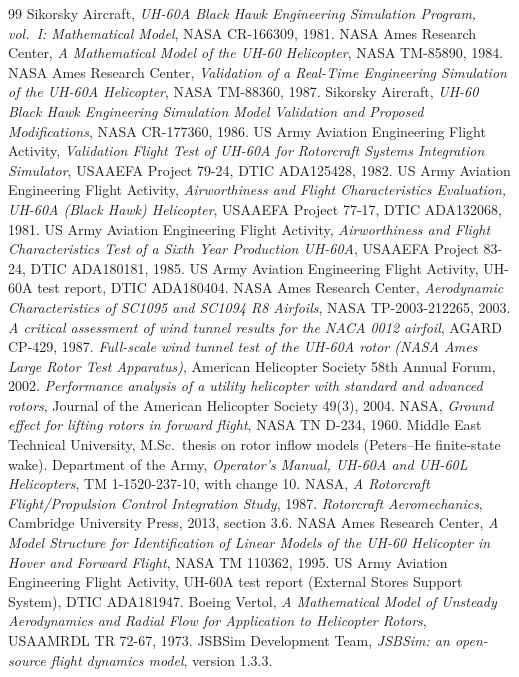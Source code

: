 \documentclass[10pt,a4paper,twocolumn]{article}
\begin{document}
\begin{thebibliography}{99}\small
{} Sikorsky Aircraft, \emph{UH-60A Black Hawk Engineering Simulation Program, vol.~I: Mathematical Model}, NASA CR-166309, 1981.
 NASA Ames Research Center, \emph{A Mathematical Model of the UH-60 Helicopter}, NASA TM-85890, 1984.
 NASA Ames Research Center, \emph{Validation of a Real-Time Engineering Simulation of the UH-60A Helicopter}, NASA TM-88360, 1987.
 Sikorsky Aircraft, \emph{UH-60 Black Hawk Engineering Simulation Model Validation and Proposed Modifications}, NASA CR-177360, 1986.
 US Army Aviation Engineering Flight Activity, \emph{Validation Flight Test of UH-60A for Rotorcraft Systems Integration Simulator}, USAAEFA Project 79-24, DTIC ADA125428, 1982.
 US Army Aviation Engineering Flight Activity, \emph{Airworthiness and Flight Characteristics Evaluation, UH-60A (Black Hawk) Helicopter}, USAAEFA Project 77-17, DTIC ADA132068, 1981.
 US Army Aviation Engineering Flight Activity, \emph{Airworthiness and Flight Characteristics Test of a Sixth Year Production UH-60A}, USAAEFA Project 83-24, DTIC ADA180181, 1985.
 US Army Aviation Engineering Flight Activity, UH-60A test report, DTIC ADA180404.
 NASA Ames Research Center, \emph{Aerodynamic Characteristics of SC1095 and SC1094 R8 Airfoils}, NASA TP-2003-212265, 2003.
 \emph{A critical assessment of wind tunnel results for the NACA 0012 airfoil}, AGARD CP-429, 1987.
 \emph{Full-scale wind tunnel test of the UH-60A rotor (NASA Ames Large Rotor Test Apparatus)}, American Helicopter Society 58th Annual Forum, 2002.
 \emph{Performance analysis of a utility helicopter with standard and advanced rotors}, Journal of the American Helicopter Society 49(3), 2004.
 NASA, \emph{Ground effect for lifting rotors in forward flight}, NASA TN D-234, 1960.
 Middle East Technical University, M.Sc.\ thesis on rotor inflow models (Peters--He finite-state wake).
 Department of the Army, \emph{Operator's Manual, UH-60A and UH-60L Helicopters}, TM 1-1520-237-10, with change 10.
 NASA, \emph{A Rotorcraft Flight/Propulsion Control Integration Study}, 1987.
 \emph{Rotorcraft Aeromechanics}, Cambridge University Press, 2013, section 3.6.
 NASA Ames Research Center, \emph{A Model Structure for Identification of Linear Models of the UH-60 Helicopter in Hover and Forward Flight}, NASA TM 110362, 1995.
 US Army Aviation Engineering Flight Activity, UH-60A test report (External Stores Support System), DTIC ADA181947.
 Boeing Vertol, \emph{A Mathematical Model of Unsteady Aerodynamics and Radial Flow for Application to Helicopter Rotors}, USAAMRDL TR 72-67, 1973.
 JSBSim Development Team, \emph{JSBSim: an open-source flight dynamics model}, version 1.3.3.
\end{thebibliography}
\end{document}
